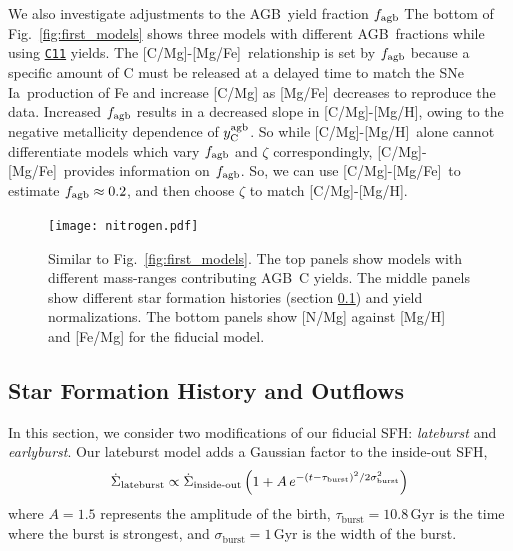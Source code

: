 \documentclass[fleqn,
usenatbib]{mnras}
\newcommand{\cxi}{\texttt{\hyperlink{C11}{C11}}}
\newcommand{\agb}{AGB}
\newcommand{\ia}{SNe Ia}
\newcommand{\sfh}{SFH} %
\newcommand{\caah}{[C/Mg]-[Mg/H]}
\newcommand{\caafe}{[C/Mg]-[Mg/Fe]}
\newcommand{\Ycagb}{\ensuremath{y_{\rm C}^{\rm agb}}}
\begin{document}
We also investigate adjustments to the \agb\ yield fraction $f_{\rm agb}$
The bottom of Fig.~\ref{fig:first_models} shows three models with different \agb\ fractions while using \cxi{} yields.  The \caafe~relationship is set by $f_{\rm agb}$ because a specific amount of C must be released at a delayed time to match the \ia\ production of Fe and increase [C/Mg] as [Mg/Fe] decreases to reproduce the data.
Increased $f_{\rm agb}$ results in a decreased slope in \caah, owing to the negative metallicity dependence of $\Ycagb$. So while \caah~alone cannot differentiate models which vary $f_{\rm agb}$ and $\zeta$ correspondingly, \caafe~provides information on $f_{\rm agb}$. So, we can use \caafe~to estimate $f_{\rm agb}\approx 0.2$, and then choose $\zeta$ to match \caah.




\begin{figure}
\centering
\texttt{[image: nitrogen.pdf]}

\caption[]{Similar to Fig.~\ref{fig:first_models}. The top panels show models with different mass-ranges contributing \agb\ C yields. The middle panels show different star formation histories (section \ref{sec:sfh}) and yield normalizations. The bottom panels show [N/Mg] against [Mg/H] and [Fe/Mg] for the fiducial model.
}
\label{fig:nitrogen}
\end{figure}





\subsection{Star Formation History and Outflows} \label{sec:sfh}

In this section, we consider two modifications of our fiducial \sfh{}: \textit{lateburst} and \textit{earlyburst}.
Our lateburst model adds a Gaussian factor to the inside-out \sfh{},
\begin{equation}\label{eq:lateburst}
    \dot{\Sigma}_\text{lateburst} \propto \dot{\Sigma}_\text{inside-out} \left(1 + A\,e^{-(t-\tau_{\rm burst})^2/2\sigma^2_{\rm burst}} \right)
\end{equation}
where $A=1.5$ represents the amplitude of the birth, $\tau_\text{burst}=10.8$\,Gyr is the time where the burst is strongest, and $\sigma_\text{burst}=1$\,Gyr is the width of the burst.
\end{document}

